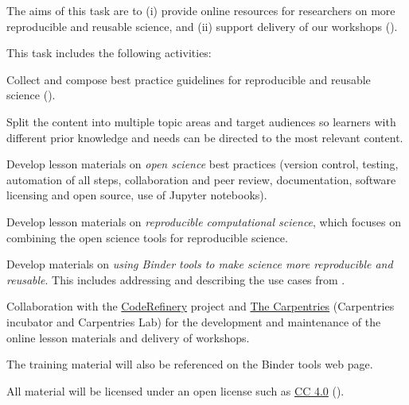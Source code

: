 \begin{task}[
  title=Best practice guidelines for reproducible science,
  id=online-resources,
  lead=IFR,
  PM=13,
  partners={SRL,MP,UIO}
]
The aims of this task are to (i) provide online resources for researchers on more reproducible
and reusable science, and (ii) support delivery of our workshops
().

This task includes the following activities:
  \begin{compactitem}
  \item Collect and compose best practice guidelines for reproducible and
    reusable science ().
  \item Split the content into multiple topic areas and target audiences so learners
    with different prior knowledge and needs can be directed to the most relevant content.
  \item Develop lesson materials on \emph{open science} best practices (version
    control, testing, automation of all steps, collaboration and peer review,
    documentation, software licensing and open source, use of Jupyter
    notebooks).
  \item Develop lesson materials on \emph{reproducible computational science},
    which focuses on combining the open science tools for reproducible science.
  \item Develop materials on \emph{using Binder tools to make science more
      reproducible and reusable}. This includes addressing and describing the
    use cases from .
  \item Collaboration with the \href{https://coderefinery.org}{CodeRefinery}
    project and \href{https://carpentries.org/}{The Carpentries} (Carpentries incubator and Carpentries Lab)
    for the development and maintenance of the online lesson materials and delivery of workshops.
  \item The training material will also be referenced on the Binder tools web page.
  \end{compactitem}
  All material will be licensed under an open license such as
  \href{https://creativecommons.org/licenses/by/4.0/}{CC 4.0}
  ().
\end{task}
